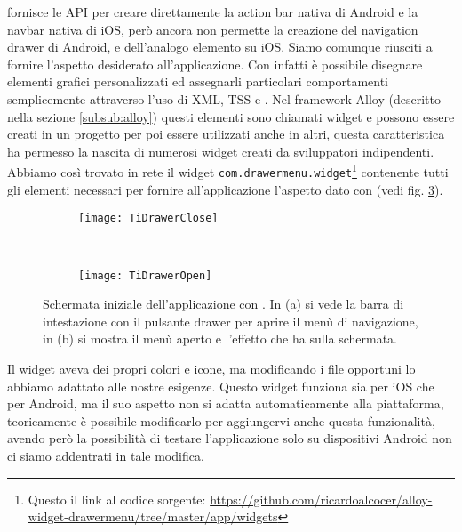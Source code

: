             \tisdk{} fornisce le API per creare direttamente la action bar nativa
            di Android e la navbar nativa di iOS, però ancora non permette la
            creazione del navigation drawer di Android, e dell'analogo
            elemento su iOS. Siamo comunque riusciti a fornire l'aspetto
            desiderato all'applicazione.
            Con \tisdk{} infatti è possibile disegnare elementi grafici
            personalizzati ed assegnarli particolari comportamenti
            semplicemente attraverso l'uso di XML, TSS e \js{}. Nel framework Alloy
            (descritto nella sezione \ref{subsub:alloy}) questi elementi sono
            chiamati widget e possono essere creati in un progetto per poi essere
            utilizzati anche in altri, questa caratteristica ha permesso la nascita
            di numerosi widget creati da sviluppatori indipendenti.
            Abbiamo così trovato in rete il widget
            \texttt{com.drawermenu.widget}\footnote{Questo il link al codice
            sorgente: \url{https://github.com/ricardoalcocer/alloy-widget-drawermenu/tree/master/app/widgets}}
            contenente tutti gli elementi necessari per fornire all'applicazione
            l'aspetto dato con \kendomob{} (vedi fig. \ref{fig:tidrawer}).
            \begin{figure}[h]
                \centering
                \begin{subfigure}[b]{0.485\textwidth}
                    \texttt{[image: TiDrawerClose]}
                    \caption{}
                    \label{fig:tiDrawerClose}
                \end{subfigure}
                ~
                \begin{subfigure}[b]{0.485\textwidth}
                    \texttt{[image: TiDrawerOpen]}
                    \caption{}
                    \label{fig:tiDrawerOpen}
                \end{subfigure}
                \caption{Schermata iniziale dell'applicazione con \tisdk{}.
                In (a) si vede la barra di intestazione con il pulsante drawer per aprire
                il menù di navigazione, in (b) si mostra il menù aperto
                e l'effetto che ha sulla schermata.}
                \label{fig:tidrawer}
            \end{figure}
            Il widget aveva dei propri colori e icone, ma modificando i file
            opportuni lo abbiamo adattato alle nostre esigenze.
            Questo widget funziona sia per iOS che per Android, ma il suo aspetto
            non si adatta automaticamente alla piattaforma, teoricamente è possibile
            modificarlo per aggiungervi anche questa funzionalità, avendo però
            la possibilità di testare l'applicazione solo su dispositivi Android
            non ci siamo addentrati in tale modifica.


